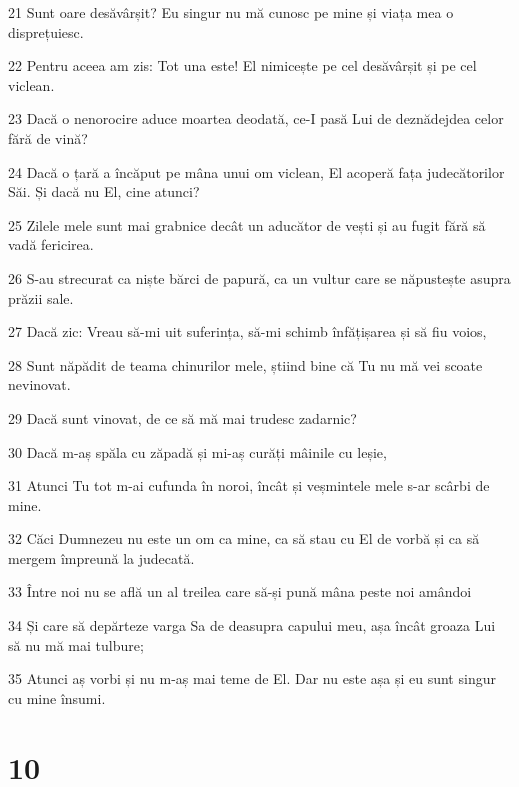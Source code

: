 \par 21 Sunt oare desăvârșit? Eu singur nu mă cunosc pe mine și viața mea o disprețuiesc.
\par 22 Pentru aceea am zis: Tot una este! El nimicește pe cel desăvârșit și pe cel viclean.
\par 23 Dacă o nenorocire aduce moartea deodată, ce-I pasă Lui de deznădejdea celor fără de vină?
\par 24 Dacă o țară a încăput pe mâna unui om viclean, El acoperă fața judecătorilor Săi. Și dacă nu El, cine atunci?
\par 25 Zilele mele sunt mai grabnice decât un aducător de vești și au fugit fără să vadă fericirea.
\par 26 S-au strecurat ca niște bărci de papură, ca un vultur care se năpustește asupra prăzii sale.
\par 27 Dacă zic: Vreau să-mi uit suferința, să-mi schimb înfățișarea și să fiu voios,
\par 28 Sunt năpădit de teama chinurilor mele, știind bine că Tu nu mă vei scoate nevinovat.
\par 29 Dacă sunt vinovat, de ce să mă mai trudesc zadarnic?
\par 30 Dacă m-aș spăla cu zăpadă și mi-aș curăți mâinile cu leșie,
\par 31 Atunci Tu tot m-ai cufunda în noroi, încât și veșmintele mele s-ar scârbi de mine.
\par 32 Căci Dumnezeu nu este un om ca mine, ca să stau cu El de vorbă și ca să mergem împreună la judecată.
\par 33 Între noi nu se află un al treilea care să-și pună mâna peste noi amândoi
\par 34 Și care să depărteze varga Sa de deasupra capului meu, așa încât groaza Lui să nu mă mai tulbure;
\par 35 Atunci aș vorbi și nu m-aș mai teme de El. Dar nu este așa și eu sunt singur cu mine însumi.

\chapter{10}

